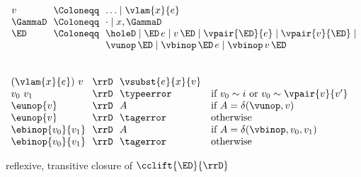 \begin{flushleft}

\\
$\begin{array}{l@{~~}c@{~~}l}
  v & \Coloneqq & \ldots \mid \vlam{x}{e}
\\
  \GammaD & \Coloneqq & \cdot \mid x,\GammaD
\\
  \ED & \Coloneqq & \holeD \mid \ED\,e \mid v\,\ED \mid \vpair{\ED}{e} \mid \vpair{v}{\ED} \mid
\\ & & \vunop\,\ED \mid \vbinop\,\ED\,e \mid \vbinop\,v\,\ED
\end{array}$

\medskip
{}
\begin{mathpar}






\end{mathpar}

\medskip
{}\\
$\begin{array}{l@{~~}c@{~~}l l}
  (\vlam{x}{e})~v & \rrD & \vsubst{e}{x}{v} &
\\
  v_0~v_1 & \rrD & \typeerror & \mbox{if $v_0 \sim i$ or $v_0 \sim \vpair{v}{v'}$}
\\
  \eunop{v} & \rrD & A & \mbox{if $A = \delta(\vunop, v)$}
\\
  \eunop{v} & \rrD & \tagerror & \mbox{otherwise}
\\
  \ebinop{v_0}{v_1} & \rrD & A & \mbox{if $A = \delta(\vbinop, v_0, v_1)$}
\\
  \ebinop{v_0}{v_1} & \rrD & \tagerror & \mbox{otherwise}
\end{array}$

\medskip
{} reflexive, transitive closure of $\cclift{\ED}{\rrD}$

\end{flushleft}
